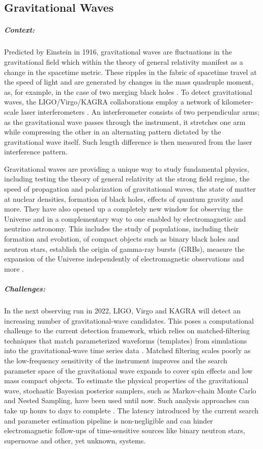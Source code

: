\subsection{Gravitational Waves}
\subparagraph*{Context:}
        Predicted by Einstein in 1916, gravitational waves are fluctuations in the gravitational field which within the theory of general relativity manifest as a change in the spacetime metric. 
        These ripples in the fabric of spacetime travel at the speed of light and are generated by changes in the mass quadruple moment, as, for example, in the case of two merging black holes \cite{PhysRevLett.116.061102}.
        To detect gravitational waves, the LIGO/Virgo/KAGRA collaborations employ a network of kilometer-scale laser interferometers \cite{aLIGO, Acernese_2014, Affeldt_2014, PhysRevD.88.043007}.
        An interferometer consists of two perpendicular arms;
        as the gravitational wave passes through the instrument, it stretches one arm while compressing the other in an alternating pattern dictated by the gravitational wave itself. 
        Such length difference is then measured from the laser interference pattern.
        
        Gravitational waves are providing a unique way to study fundamental physics, including testing the theory of general relativity at the strong field regime, the speed of propagation and polarization of gravitational waves, the state of matter at nuclear densities, formation of black holes, effects of quantum gravity and more.
        They have also opened up a completely new window for observing the Universe and in a complementary way to one enabled by electromagnetic and neutrino astronomy.
        This includes the study of populations, including their formation and evolution, of compact objects such as binary black holes and neutron stars, establish the origin of gamma-ray bursts (GRBs), measure the expansion of the Universe independently of electromagnetic observations and more \cite{PhysRevLett.119.161101}. 
        
\subparagraph*{Challenges:}
        In the next observing run in 2022, LIGO, Virgo and KAGRA will detect an increasing number of gravitational-wave candidates. 
        This poses a computational challenge to the current detection framework, which relies on matched-filtering techniques that match parameterized waveforms (templates) from simulations into the gravitational-wave time series data \cite{PhysRevLett.116.061102, Vas2001, PhysRevD.44.3819}.
        Matched filtering scales poorly as the low-frequency sensitivity of the instrument improves and the search parameter space of the gravitational wave expands to cover spin effects and low mass compact objects.
        To estimate the physical properties of the gravitational wave, stochastic Bayesian posterior samplers, such as Markov-chain Monte Carlo and Nested Sampling, have been used until now. Such analysis approaches can take up hours to days to complete \cite{Abbott_2016}.
        The latency introduced by the current search and parameter estimation pipeline is non-negligible and can hinder electromagnetic follow-ups of time-sensitive sources like binary neutron stars, supernovae and other, yet unknown, systems.
        

